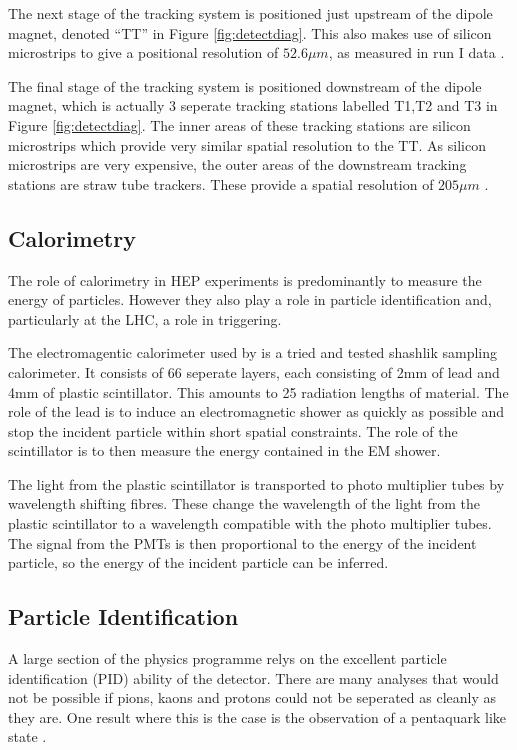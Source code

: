  The next stage of the \lhcb tracking system is positioned just upstream of the dipole magnet, denoted ``TT'' in Figure \ref{fig:detectdiag}.  This also makes use of silicon microstrips to give a positional resolution of $52.6 \mu m$, as measured in run I data \cite{Aaij:1978280}.

The final stage of the tracking system is positioned downstream of the dipole magnet, which is actually 3 seperate tracking stations labelled T1,T2 and T3 in Figure \ref{fig:detectdiag}.  The inner areas of these tracking stations are silicon microstrips which provide very similar spatial resolution to the TT.  As silicon microstrips are very expensive, the outer areas of the downstream tracking stations are straw tube trackers.  These provide a spatial resolution of $205 \mu m$ \cite{Aaij:1978280}.

 
\subsection{Calorimetry}
\label{sec:Calorimetry}
The role of calorimetry in HEP experiments is predominantly to measure the energy of particles.  However they also play a role in particle identification and, particularly at the LHC, a role in triggering.

The electromagentic calorimeter used by \lhcb is a tried and tested shashlik sampling calorimeter.  It consists of 66 seperate layers, each consisting of 2mm of lead and 4mm of plastic scintillator.  This amounts to 25 radiation lengths of material.  The role of the lead is to induce an electromagnetic shower as quickly as possible and stop the incident particle within short spatial constraints.  The role of the scintillator is to then measure the energy contained in the EM shower.

The light from the plastic scintillator is transported to photo multiplier tubes by wavelength shifting fibres.  These change the wavelength of the light from the plastic scintillator to a wavelength compatible with the photo multiplier tubes.  The signal from the PMTs is then proportional to the energy of the incident particle, so the energy of the incident particle can be inferred.

\subsection{Particle Identification}
\label{sec:Particle Identification}
A large section of the \lhcb physics programme relys on the excellent particle identification (PID) ability of the \lhcb detector.  There are many analyses that would not be possible if pions, kaons and protons could not be seperated as cleanly as they are. One result where this is the case is the observation of a pentaquark like state \cite{LHCb-PAPER-2015-029}.

